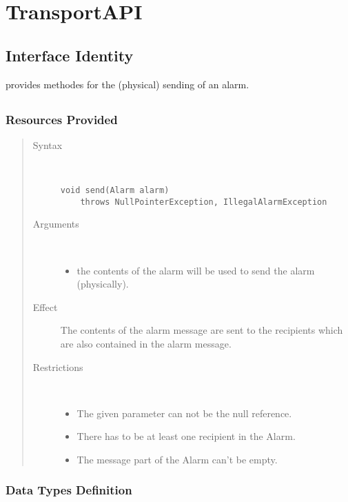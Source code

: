 \section{TransportAPI}
\label{api:notification-unit-transport-api}

\subsection{Interface Identity}

\npar {} provides methodes for the (physical) sending of
an alarm.

\subsection{}

\subsubsection{Resources Provided}

\begin{quote}
	\begin{description}
		\item[Syntax] \
		\begin{verbatim}
void send(Alarm alarm)
    throws NullPointerException, IllegalAlarmException
		\end{verbatim}
		\item[Arguments] \
		\begin{itemize}
		  \item the contents of the alarm will be used to send the alarm (physically). 
		\end{itemize}
		\item[Effect] The contents of the alarm message are sent to the recipients
		which are also contained in the alarm message.
		\item[Restrictions] \
		\begin{itemize}
		  \item The given parameter can not be the null reference.
		  \item There has to be at least one recipient in the Alarm.
		  \item The message part of the Alarm can't be empty.
		\end{itemize}
	\end{description} 
\end{quote}

\subsubsection{Data Types Definition}

